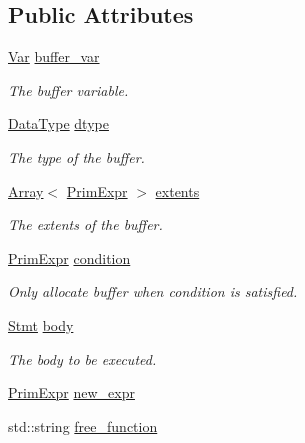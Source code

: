 \subsection*{Public Attributes}
\begin{DoxyCompactItemize}
\item 
\hyperlink{classtvm_1_1tir_1_1Var}{Var} \hyperlink{classtvm_1_1tir_1_1AllocateNode_acc0828bc8173ba2d46f90ddd2a329ae0}{buffer\+\_\+var}
\begin{DoxyCompactList}\small\item\em The buffer variable. \end{DoxyCompactList}\item 
\hyperlink{namespacetvm_a41918af1a1dc386388639a9d3ad06c5d}{Data\+Type} \hyperlink{classtvm_1_1tir_1_1AllocateNode_aba885cfd49a10c594320d0e84a9a4c90}{dtype}
\begin{DoxyCompactList}\small\item\em The type of the buffer. \end{DoxyCompactList}\item 
\hyperlink{classtvm_1_1Array}{Array}$<$ \hyperlink{classtvm_1_1PrimExpr}{Prim\+Expr} $>$ \hyperlink{classtvm_1_1tir_1_1AllocateNode_a0f6d59cffc5fda07450e0fdab6b66bcb}{extents}
\begin{DoxyCompactList}\small\item\em The extents of the buffer. \end{DoxyCompactList}\item 
\hyperlink{classtvm_1_1PrimExpr}{Prim\+Expr} \hyperlink{classtvm_1_1tir_1_1AllocateNode_a6b855ad51d1fcb4e21e9afe657f77ba5}{condition}
\begin{DoxyCompactList}\small\item\em Only allocate buffer when condition is satisfied. \end{DoxyCompactList}\item 
\hyperlink{classtvm_1_1tir_1_1Stmt}{Stmt} \hyperlink{classtvm_1_1tir_1_1AllocateNode_a797e50c85f4bc016bcf3a3a22737980e}{body}
\begin{DoxyCompactList}\small\item\em The body to be executed. \end{DoxyCompactList}\item 
\hyperlink{classtvm_1_1PrimExpr}{Prim\+Expr} \hyperlink{classtvm_1_1tir_1_1AllocateNode_a52b31635e23aeb6e18e83aa3cc9f8d00}{new\+\_\+expr}
\item 
std\+::string \hyperlink{classtvm_1_1tir_1_1AllocateNode_ac2c84aa70f243d933c0480331910de52}{free\+\_\+function}
\end{DoxyCompactItemize}
